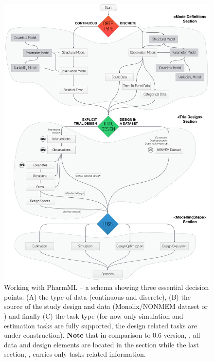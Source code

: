 \newpage
\begin{figure}[htb!]
\centering
  \includegraphics[width=165mm]{pics/Flowchart07}
 \caption{Working with PharmML -- a schema showing three essential decision points: 
 (A) the type of data (continuous and discrete), (B) the source of the study design and 
 data (Monolix/NONMEM dataset or ) and finally (C) the task type 
 (for now only simulation and estimation tasks are fully supported, the design related 
 tasks are under construction). \textbf{Note} that in comparison to 0.6 version, \cite{Pharmml_06}, 
 all data and design elements are located in the  section while the last 
 section, , carries only tasks related information.}
 \label{fig:Flowchart07}
\end{figure}

\newpage

%


